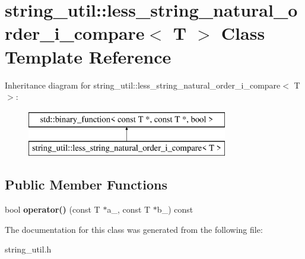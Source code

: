\section{string\+\_\+util\+:\+:less\+\_\+string\+\_\+natural\+\_\+order\+\_\+i\+\_\+compare$<$ T $>$ Class Template Reference}
\label{classstring__util_1_1less__string__natural__order__i__compare}
Inheritance diagram for string\+\_\+util\+:\+:less\+\_\+string\+\_\+natural\+\_\+order\+\_\+i\+\_\+compare$<$ T $>$\+:\begin{figure}[H]
\begin{center}
\leavevmode
\includegraphics[height=2.000000cm]{classstring__util_1_1less__string__natural__order__i__compare}
\end{center}
\end{figure}
\subsection*{Public Member Functions}
\begin{DoxyCompactItemize}
\item 
bool {\bfseries operator()} (const T $\ast$a\+\_\+, const T $\ast$b\+\_\+) const \label{classstring__util_1_1less__string__natural__order__i__compare_a213ba84bcb81fa025951194acbdb899c}

\end{DoxyCompactItemize}


The documentation for this class was generated from the following file\+:\begin{DoxyCompactItemize}
\item 
string\+\_\+util.\+h\end{DoxyCompactItemize}
